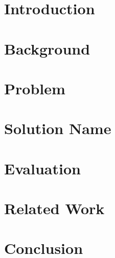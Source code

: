 \documentclass[sigconf]{acmart}
\begin{document}
\begin{abstract}
    
\end{abstract}




\maketitle

\section{Introduction}
\label{sec:intro}


\section{Background}
\label{sec:background}
 


\section{Problem}
\label{sec:design_space}

 
\section{Solution Name}
\label{sec:solution}


% 

\section{Evaluation}
\label{sec:experimental_results}


\section{Related Work}
\label{sec:related_work}

 
\section{Conclusion}
\label{sec:conclusion}



\balance 
{
 
} 
\end{document}
